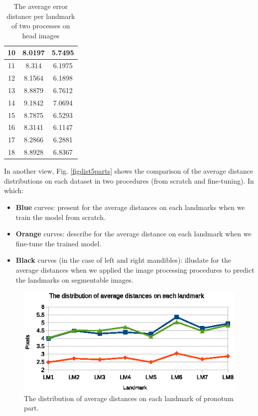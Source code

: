 \documentclass[review]{elsarticle}
\begin{document}
\begin{table}[htbp]
\begin{minipage}[t]{0.45\textwidth}
\begin{tabular}{|c|c|c|}
	10 & 8.0197 & 5.7495 \\ \hline
	11 & 8.314 & 6.1975 \\ \hline
	12 & 8.1564 & 6.1898 \\ \hline
	13 & 8.8879 & 6.7612 \\ \hline
	14 & 9.1842 & 7.0694 \\ \hline
	15 & 8.7875 & 6.5293 \\ \hline
	16 & 8.3141 & 6.1147 \\ \hline
	17 & 8.2866 & 6.2881 \\ \hline
	18 & 8.8928 & 6.8367 \\ \hline
\end{tabular}
\caption{The average error distance per landmark of two processes on head images}
\label{tblcmpmd}
\end{minipage}
\end{table}

In another view, Fig. \ref{figdist5parts} shows the comparison of the average distance distributions on each dataset in two procedures (from scratch and fine-tuning). In which:
\begin{itemize}
	\item \textbf{Blue} curves: present for the average distances on each landmarks when we train the model from scratch.
	\item \textbf{Orange} curves: describe for the average distance on each landmark when we fine-tune the trained model.
	\item \textbf{Black} curves (in the case of left and right mandibles): illuslate for the average distances when we applied the image processing procedures to predict the landmarks on segmentable images.
\end{itemize}

\iffalse
\begin{figure}[htbp]
	\centerline{\includegraphics[scale=0.55]{images/prono_part}}
	\caption{The distribution of average distances on each landmark of pronotum part.}
	\label{figdistpronotum}
\end{figure}
\end{document}

